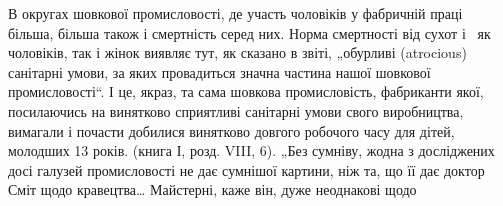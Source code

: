 \noindent{}В округах шовкової промисловості, де участь чоловіків
у фабричній праці більша, більша також і смертність серед них.
Норма смертності від сухот і~ як чоловіків, так і жінок
виявляє тут, як сказано в звіті, „обурливі (atrocious) санітарні
умови, за яких провадиться значна частина нашої шовкової
промисловості“. І це, якраз, та сама шовкова промисловість,
фабриканти якої, посилаючись на винятково сприятливі санітарні умови свого виробництва, вимагали і
почасти добилися
винятково довгого робочого часу для дітей, молодших 13 років.
(книга І, розд. VIII, 6).
„Без сумніву, жодна з досліджених досі галузей промисловості
не дає сумнішої картини, ніж та, що її дає доктор Сміт
щодо кравецтва\dots{} Майстерні, каже він, дуже неоднакові щодо

\parbreak{}  %
